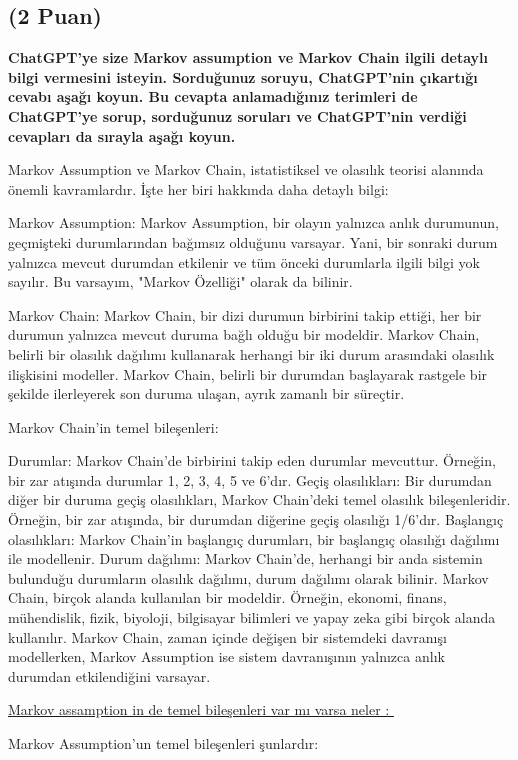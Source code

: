 \documentclass[11pt]{article}
\begin{document}
\subsection{(2 Puan)} \textbf{ChatGPT’ye size Markov assumption ve Markov Chain ilgili detaylı bilgi vermesini isteyin. Sorduğunuz soruyu, ChatGPT'nin çıkartığı cevabı aşağı koyun. Bu cevapta anlamadığınız terimleri de ChatGPT’ye sorup, sorduğunuz soruları ve ChatGPT’nin verdiği cevapları da sırayla aşağı koyun.}

Markov Assumption ve Markov Chain, istatistiksel ve olasılık teorisi alanında önemli kavramlardır. İşte her biri hakkında daha detaylı bilgi:

Markov Assumption:
Markov Assumption, bir olayın yalnızca anlık durumunun, geçmişteki durumlarından bağımsız olduğunu varsayar. Yani, bir sonraki durum yalnızca mevcut durumdan etkilenir ve tüm önceki durumlarla ilgili bilgi yok sayılır. Bu varsayım, "Markov Özelliği" olarak da bilinir.

Markov Chain:
Markov Chain, bir dizi durumun birbirini takip ettiği, her bir durumun yalnızca mevcut duruma bağlı olduğu bir modeldir. Markov Chain, belirli bir olasılık dağılımı kullanarak herhangi bir iki durum arasındaki olasılık ilişkisini modeller. Markov Chain, belirli bir durumdan başlayarak rastgele bir şekilde ilerleyerek son duruma ulaşan, ayrık zamanlı bir süreçtir.

Markov Chain'in temel bileşenleri:

Durumlar: Markov Chain'de birbirini takip eden durumlar mevcuttur. Örneğin, bir zar atışında durumlar 1, 2, 3, 4, 5 ve 6'dır.
Geçiş olasılıkları: Bir durumdan diğer bir duruma geçiş olasılıkları, Markov Chain'deki temel olasılık bileşenleridir. Örneğin, bir zar atışında, bir durumdan diğerine geçiş olasılığı 1/6'dır.
Başlangıç olasılıkları: Markov Chain'in başlangıç durumları, bir başlangıç olasılığı dağılımı ile modellenir.
Durum dağılımı: Markov Chain'de, herhangi bir anda sistemin bulunduğu durumların olasılık dağılımı, durum dağılımı olarak bilinir.
Markov Chain, birçok alanda kullanılan bir modeldir. Örneğin, ekonomi, finans, mühendislik, fizik, biyoloji, bilgisayar bilimleri ve yapay zeka gibi birçok alanda kullanılır. Markov Chain, zaman içinde değişen bir sistemdeki davranışı modellerken, Markov Assumption ise sistem davranışının yalnızca anlık durumdan etkilendiğini varsayar.

\underline{Markov assamption in de temel bileşenleri var mı varsa neler : }
\ 

Markov Assumption'un temel bileşenleri şunlardır:
\end{document}
